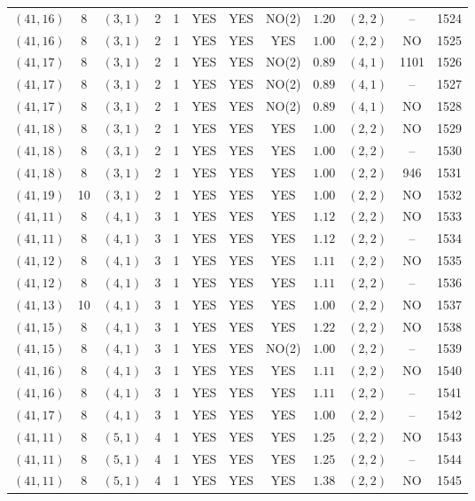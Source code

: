 \begin{longtable}{|c|c|c|c|c|c|c|c|c|c|c|c|}
$(41,16)$ & 8 & $(3,1)$ & 2 & 1 & YES & YES & NO(2) & $1.20$ & $(2,2)$ & -- & 1524\\
$(41,16)$ & 8 & $(3,1)$ & 2 & 1 & YES & YES & YES & $1.00$ & $(2,2)$ & NO & 1525\\
$(41,17)$ & 8 & $(3,1)$ & 2 & 1 & YES & YES & NO(2) & $0.89$ & $(4,1)$ & 1101 & 1526\\
$(41,17)$ & 8 & $(3,1)$ & 2 & 1 & YES & YES & NO(2) & $0.89$ & $(4,1)$ & -- & 1527\\
$(41,17)$ & 8 & $(3,1)$ & 2 & 1 & YES & YES & NO(2) & $0.89$ & $(4,1)$ & NO & 1528\\
$(41,18)$ & 8 & $(3,1)$ & 2 & 1 & YES & YES & YES & $1.00$ & $(2,2)$ & NO & 1529\\
$(41,18)$ & 8 & $(3,1)$ & 2 & 1 & YES & YES & YES & $1.00$ & $(2,2)$ & -- & 1530\\
$(41,18)$ & 8 & $(3,1)$ & 2 & 1 & YES & YES & YES & $1.00$ & $(2,2)$ & 946 & 1531\\
$(41,19)$ & 10 & $(3,1)$ & 2 & 1 & YES & YES & YES & $1.00$ & $(2,2)$ & NO & 1532\\
$(41,11)$ & 8 & $(4,1)$ & 3 & 1 & YES & YES & YES & $1.12$ & $(2,2)$ & NO & 1533\\
$(41,11)$ & 8 & $(4,1)$ & 3 & 1 & YES & YES & YES & $1.12$ & $(2,2)$ & -- & 1534\\
$(41,12)$ & 8 & $(4,1)$ & 3 & 1 & YES & YES & YES & $1.11$ & $(2,2)$ & NO & 1535\\
$(41,12)$ & 8 & $(4,1)$ & 3 & 1 & YES & YES & YES & $1.11$ & $(2,2)$ & -- & 1536\\
$(41,13)$ & 10 & $(4,1)$ & 3 & 1 & YES & YES & YES & $1.00$ & $(2,2)$ & NO & 1537\\
$(41,15)$ & 8 & $(4,1)$ & 3 & 1 & YES & YES & YES & $1.22$ & $(2,2)$ & NO & 1538\\
$(41,15)$ & 8 & $(4,1)$ & 3 & 1 & YES & YES & NO(2) & $1.00$ & $(2,2)$ & -- & 1539\\
$(41,16)$ & 8 & $(4,1)$ & 3 & 1 & YES & YES & YES & $1.11$ & $(2,2)$ & NO & 1540\\
$(41,16)$ & 8 & $(4,1)$ & 3 & 1 & YES & YES & YES & $1.11$ & $(2,2)$ & -- & 1541\\
$(41,17)$ & 8 & $(4,1)$ & 3 & 1 & YES & YES & YES & $1.00$ & $(2,2)$ & -- & 1542\\
$(41,11)$ & 8 & $(5,1)$ & 4 & 1 & YES & YES & YES & $1.25$ & $(2,2)$ & NO & 1543\\
$(41,11)$ & 8 & $(5,1)$ & 4 & 1 & YES & YES & YES & $1.25$ & $(2,2)$ & -- & 1544\\
$(41,11)$ & 8 & $(5,1)$ & 4 & 1 & YES & YES & YES & $1.38$ & $(2,2)$ & NO & 1545\\

\end{longtable}
